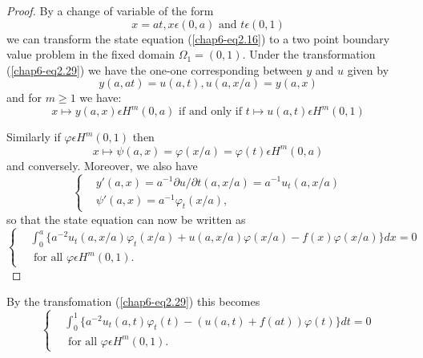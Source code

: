 \begin{proof}
By a change of variable of the form
\begin{equation*}
x = at, x \epsilon (0, a) \text{ and } t \epsilon (0, 1)\tag{2.29}\label{chap6-eq2.29}
\end{equation*}
we can transform the state equation (\ref{chap6-eq2.16}) to a two
point boundary value problem in the fixed domain $\Omega_{1} = (0,
1)$. Under the transformation (\ref{chap6-eq2.29}) we have the one-one
corresponding between $y$ and $u$ given by 
\begin{equation*}
y(a, at) = u(a, t), u(a, x/a) = y(a, x)\tag{2.30}\label{chap6-eq2.30}
\end{equation*}
and for $m \geq 1$ we have:
\begin{equation*}
x \mapsto y(a, x)\epsilon H^{m} (0, a) \text{ if and only if } t \mapsto u(a, t) \epsilon H^{m}(0, 1)\tag{2.31}\label{chap6-eq2.31}
\end{equation*}\pageoriginale

Similarly if $\varphi \epsilon H^{m}(0, 1)$ then
\begin{equation*}
x \mapsto \psi(a, x) = \varphi(x/a) = \varphi(t) \epsilon H^{m} (0, a)\tag{2.32}\label{chap6-eq2.32}
\end{equation*}
and conversely. Moreover, we also have
\begin{equation*}
\begin{cases}
& y'(a, x) = a^{-1} \partial u / \partial t (a, x/a) = a^{-1} u_{t} (a, x/a)\\
& \psi' (a, x) = a^{-1} \varphi_{t} (x/a),\tag{2.33}\label{chap6-eq2.33}
\end{cases}
\end{equation*}
so that the state equation can now be written as 
\begin{equation*}
\begin{cases}
& \int_{0}^{a} \{a^{-2} u_{t} (a, x/a) \varphi_{t} (x/a) + u(a, x/a) \varphi(x/a)-f(x)\varphi(x/a) \}dx = 0\\
& \text{ for all } \varphi \epsilon H^{m}(0, 1).\tag{2.34}\label{chap6-eq2.34}
\end{cases}
\end{equation*}
\end{proof}

By the transfomation (\ref{chap6-eq2.29}) this becomes
\begin{equation*}
\begin{cases}
& \int_{0}^{1} \{a^{-2} u_{t}(a, t) \varphi_{t}(t) - (u(a, t) + f(at)) \varphi(t) \} dt = 0\\
& \text{ for all } \varphi \epsilon H^{m}(0, 1).\tag*{$(2.34)'$}\label{chap6-eq2.34'}
\end{cases}
\end{equation*}

